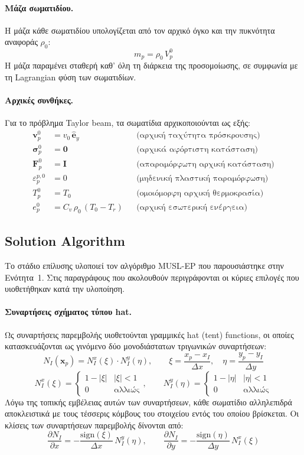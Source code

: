 \documentclass[12pt,a4paper]{report}
\begin{document}
	\paragraph{Μάζα σωματιδίου.}
	Η μάζα κάθε σωματιδίου υπολογίζεται από τον αρχικό όγκο και την πυκνότητα αναφοράς $\rho_0$:
	\[
		m_p = \rho_0\, V_p^0
	\]
	Η μάζα παραμένει σταθερή καθ' όλη τη διάρκεια της προσομοίωσης, σε συμφωνία με τη Lagrangian φύση των σωματιδίων.

	\paragraph{Αρχικές συνθήκες.}
	Για το πρόβλημα Taylor beam, τα σωματίδια αρχικοποιούνται ως εξής:
	\begin{align*}
		\mathbf{v}_p^0 &= v_0\,\hat{\mathbf{e}}_y & &\text{(αρχική ταχύτητα πρόσκρουσης)} \\
		\boldsymbol{\sigma}_p^0 &= \mathbf{0} & &\text{(αρχικά αφόρτιστη κατάσταση)} \\
		\mathbf{F}_p^0 &= \mathbf{I} & &\text{(απαραμόρφωτη αρχική κατάσταση)} \\
		\varepsilon_p^{p,0} &= 0 & &\text{(μηδενική πλαστική παραμόρφωση)} \\
		T_p^0 &= T_0 & &\text{(ομοιόμορφη αρχική θερμοκρασία)} \\
		e_p^0 &= C_v\,\rho_0\,(T_0 - T_r) & &\text{(αρχική εσωτερική ενέργεια)}
	\end{align*}

	\subsection{Solution Algorithm}

	Το στάδιο επίλυσης υλοποιεί τον αλγόριθμο MUSL-EP που παρουσιάστηκε στην Ενότητα~1. Στις παραγράφους που ακολουθούν περιγράφονται οι κύριες επιλογές που υιοθετήθηκαν κατά την υλοποίηση.

	\paragraph{Συναρτήσεις σχήματος τύπου hat.}
	Ως συναρτήσεις παρεμβολής υιοθετούνται γραμμικές hat (tent) functions, οι οποίες κατασκευάζονται ως γινόμενο δύο μονοδιάστατων τριγωνικών συναρτήσεων:
	\[
		N_I(\mathbf{x}_p) = N_I^x(\xi)\cdot N_I^y(\eta),
		\qquad
		\xi = \frac{x_p - x_I}{\Delta x},\quad \eta = \frac{y_p - y_I}{\Delta y}
	\]
	\[
		N_I^x(\xi) = \begin{cases} 1 - |\xi| & |\xi| < 1 \\ 0 & \text{αλλιώς} \end{cases},
		\qquad
		N_I^y(\eta) = \begin{cases} 1 - |\eta| & |\eta| < 1 \\ 0 & \text{αλλιώς} \end{cases}
	\]
	Λόγω της τοπικής εμβέλειας αυτών των συναρτήσεων, κάθε σωματίδιο αλληλεπιδρά αποκλειστικά με τους τέσσερις κόμβους του στοιχείου εντός του οποίου βρίσκεται. Οι κλίσεις των συναρτήσεων παρεμβολής δίνονται από:
	\[
		\frac{\partial N_I}{\partial x} = -\frac{\mathrm{sign}(\xi)}{\Delta x}\,N_I^y(\eta),
		\qquad
		\frac{\partial N_I}{\partial y} = -\frac{\mathrm{sign}(\eta)}{\Delta y}\,N_I^x(\xi)
	\]
\end{document}
